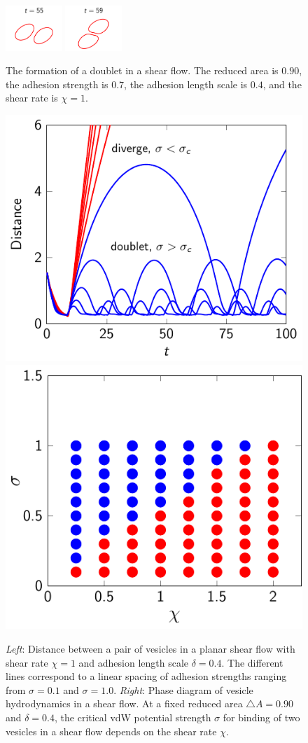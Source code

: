 \documentclass[%
preprint,
 amsmath,amssymb,
 aps,
]{revtex4-1}
\begin{document}
\begin{figure}[htp]
  \includegraphics[width=0.19\textwidth]{figs/shear_adR4em1adS7em1Chi1e0_ra090_timestep09.pdf}
  \includegraphics[width=0.19\textwidth]{figs/shear_adR4em1adS7em1Chi1e0_ra090_timestep10.pdf}
  \caption{\label{fig:doublet090} The formation of a doublet in a shear
  flow.  The reduced area is $0.90$, the adhesion strength is $0.7$, the
adhesion length scale is $0.4$, and the shear rate is $\chi=1$.}
\end{figure}

\begin{figure}
  \includegraphics[height=0.4\textwidth]{figs/shear_adR4em1Chi1e0_ra-090.pdf}
  \includegraphics[height=0.4\textwidth]{figs/shear_adR4em1_ra090_phaseDiagram.pdf}
  \caption{{\em Left}: Distance between a pair of vesicles in a planar
    shear flow with shear rate $\chi=1$ and adhesion length scale
    $\delta = 0.4$.   The different lines correspond to a linear spacing
    of adhesion strengths ranging from $\sigma=0.1$ and $\sigma=1.0$.
    {\em Right}: Phase diagram of vesicle hydrodynamics in a shear flow.
    At a fixed reduced area $\triangle A=0.90$ and $\delta =0.4$,  the
    critical vdW potential strength $\sigma$ for binding of two vesicles
    in a shear flow depends on the shear rate $\chi$.
  \label{fig:sflow_phase_diagram}}
\end{figure}
\end{document}
